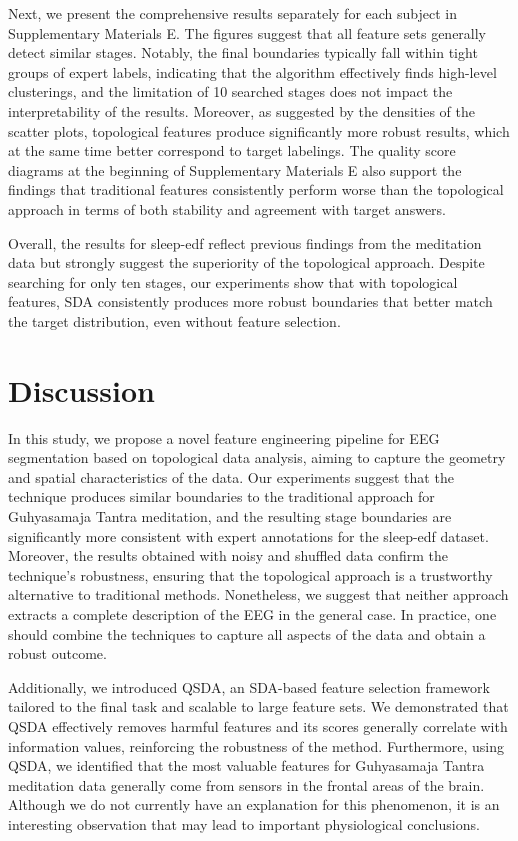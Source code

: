 \documentclass[pdflatex,sn-basic,Numbered]{sn-jnl}
\begin{document}
Next, we present the comprehensive results separately for each subject in Supplementary Materials E. The figures suggest that all feature sets generally detect similar stages. Notably, the final boundaries typically fall within tight groups of expert labels, indicating that the algorithm effectively finds high-level clusterings, and the limitation of 10 searched stages does not impact the interpretability of the results. Moreover, as suggested by the densities of the scatter plots, topological features produce significantly more robust results, which at the same time better correspond to target labelings. The quality score diagrams at the beginning of Supplementary Materials E also support the findings that traditional features consistently perform worse than the topological approach in terms of both stability and agreement with target answers.

Overall, the results for sleep-edf reflect previous findings from the meditation data but strongly suggest the superiority of the topological approach. Despite searching for only ten stages, our experiments show that with topological features, SDA consistently produces more robust boundaries that better match the target distribution, even without feature selection.\@

\section{Discussion}

In this study, we propose a novel feature engineering pipeline for EEG segmentation based on topological data analysis, aiming to capture the geometry and spatial characteristics of the data. Our experiments suggest that the technique produces similar boundaries to the traditional approach for Guhyasamaja Tantra meditation, and the resulting stage boundaries are significantly more consistent with expert annotations for the sleep-edf dataset. Moreover, the results obtained with noisy and shuffled data confirm the technique's robustness, ensuring that the topological approach is a trustworthy alternative to traditional methods. Nonetheless, we suggest that neither approach extracts a complete description of the EEG in the general case. In practice, one should combine the techniques to capture all aspects of the data and obtain a robust outcome.

Additionally, we introduced QSDA, an SDA-based feature selection framework tailored to the final task and scalable to large feature sets. We demonstrated that QSDA effectively removes harmful features and its scores generally correlate with information values, reinforcing the robustness of the method. Furthermore, using QSDA, we identified that the most valuable features for Guhyasamaja Tantra meditation data generally come from sensors in the frontal areas of the brain. Although we do not currently have an explanation for this phenomenon, it is an interesting observation that may lead to important physiological conclusions.
\end{document}
